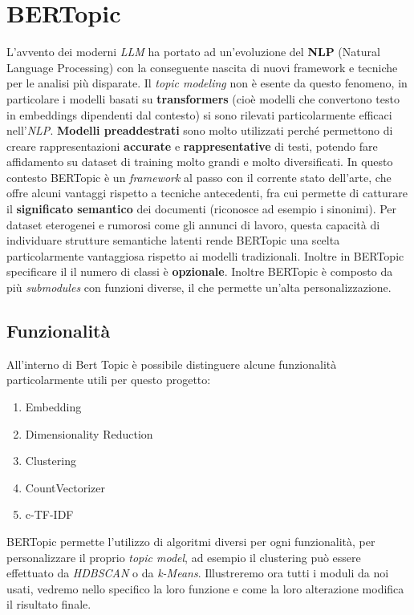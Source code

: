\chapter{BERTopic}
L'avvento dei moderni \emph{LLM} ha portato ad un'evoluzione del \textbf{NLP} (Natural Language Processing) con la conseguente nascita di nuovi framework e tecniche per le analisi più disparate.
Il \emph{topic modeling} non è esente da questo fenomeno, in particolare i modelli basati su \textbf{transformers} (cioè modelli che convertono testo in embeddings dipendenti dal contesto) si sono rilevati particolarmente efficaci nell'\emph{NLP}.
\textbf{Modelli preaddestrati} sono molto utilizzati perché permettono di creare rappresentazioni \textbf{accurate} e \textbf{rappresentative} di testi, potendo fare affidamento su dataset di training molto grandi e molto diversificati.
In questo contesto BERTopic è un \textit{framework} al passo con il corrente stato dell'arte, che offre alcuni vantaggi rispetto a tecniche antecedenti, fra cui permette di catturare il \textbf{significato semantico} dei documenti (riconosce ad esempio i sinonimi). Per dataset eterogenei e rumorosi come gli annunci di lavoro, questa capacità di individuare strutture semantiche latenti rende BERTopic una scelta particolarmente vantaggiosa rispetto ai modelli tradizionali. Inoltre in BERTopic specificare il il numero di classi è \textbf{opzionale}.
Inoltre BERTopic è composto da più \textit{submodules} con funzioni diverse, il che permette un'alta personalizzazione.

\section{Funzionalità}
All'interno di Bert Topic è possibile distinguere alcune funzionalità particolarmente utili per questo progetto:
\begin{enumerate}
\item Embedding
\item Dimensionality Reduction
\item Clustering
\item CountVectorizer
\item c-TF-IDF
\end{enumerate}

BERTopic permette l'utilizzo di algoritmi diversi per ogni funzionalità, per personalizzare il proprio \emph{topic model}, ad esempio il clustering può essere effettuato da \emph{HDBSCAN} o da \emph{k-Means}.
Illustreremo ora tutti i moduli da noi usati, vedremo nello specifico la loro funzione e come la loro alterazione modifica il risultato finale.
